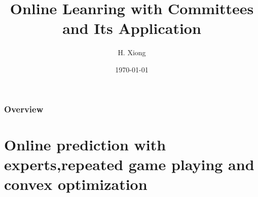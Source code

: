\documentclass{beamer}
\title[Online Learning]{Online Leanring with Committees and Its Application} %
\author{H. Xiong} %
\institute[online learning group] %
{
Online Learning Group \\ %
\medskip
\textit{@hanchenxiong} %
}
\date{\today} %
\begin{document}
\begin{frame}
\titlepage %
\end{frame}

\begin{frame}
\frametitle{Overview} %
\tableofcontents %
\end{frame}


\section[Online prediction with experts, games, convex optimization]{Online prediction with experts,repeated game playing and convex optimization}        %
\end{document}
